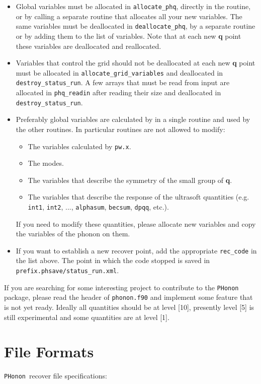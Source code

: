 \documentclass[12pt,a4paper]{article}
\def\pwx{\texttt{pw.x}}
\def\PHonon{\texttt{PHonon}}
\begin{document}
\begin{itemize}
\item
Global variables must be allocated in \texttt{allocate\_phq}, directly in the 
routine, or by calling a separate routine that allocates all
your new variables. The same variables must be deallocated in 
\texttt{deallocate\_phq}, by a separate routine or by adding them to the
list of variables. Note that at each new {\bf q} point these variables are
deallocated and reallocated. 

\item
Variables that control the grid should not be deallocated at
each new {\bf q} point must be allocated in \texttt{allocate\_grid\_variables} 
and deallocated in \texttt{destroy\_status\_run}.
A few arrays that must be read from input are allocated in 
\texttt{phq\_readin} after reading their size and deallocated in
\texttt{destroy\_status\_run}.

\item
Preferably global variables are calculated by in a single routine 
and used by the other routines. In particular routines are not allowed to 
modify:
\begin{itemize}
\item
  The variables calculated by \pwx.
\item
  The modes.
\item
  The variables that describe the symmetry of the small group of {\bf q}.
\item
  The variables that describe the response of the ultrasoft quantities
        (e.g. \texttt{int1}, \texttt{int2}, ..., \texttt{alphasum}, 
\texttt{becsum}, \texttt{dpqq}, etc.).
\end{itemize}
If you need to modify these quantities, please allocate new variables 
and copy the variables of the phonon on them.

\item
If you want to establish a new recover point, add the appropriate
\texttt{rec\_code} in the list above. The point in which the code stopped 
is saved in \texttt{prefix.phsave/status\_run.xml}. 

\end{itemize}

If you are searching for some interesting project to contribute to the
\texttt{PHonon} package, please read the header of \texttt{phonon.f90}
and implement some feature that is not yet ready. Ideally all quantities
should be at level [10], presently level [5] is still experimental and
some quantities are at level [1].


\section{File Formats}
\PHonon\ recover file specifications:
\end{document}
